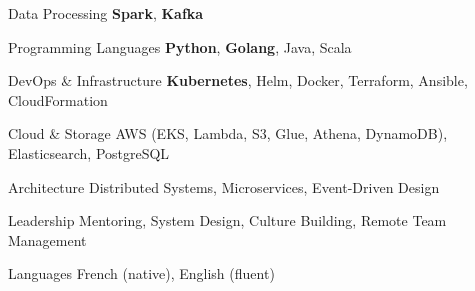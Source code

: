 

\begin{cvskills}

  \cvskill
    {Data Processing} %
    {\textbf{Spark}, \textbf{Kafka}} %

 \cvskill
  {Programming Languages} %
  {\textbf{Python}, \textbf{Golang}, Java, Scala}

\cvskill
  {DevOps \& Infrastructure} %
  {\textbf{Kubernetes}, Helm, Docker, Terraform, Ansible, CloudFormation}

\cvskill
  {Cloud \& Storage} %
  {AWS (EKS, Lambda, S3, Glue, Athena, DynamoDB), Elasticsearch, PostgreSQL}

\cvskill
  {Architecture} %
  {Distributed Systems, Microservices, Event-Driven Design}

\cvskill
  {Leadership} %
  {Mentoring, System Design, Culture Building, Remote Team Management}

\cvskill
  {Languages} %
  {French (native), English (fluent)}
\end{cvskills}
